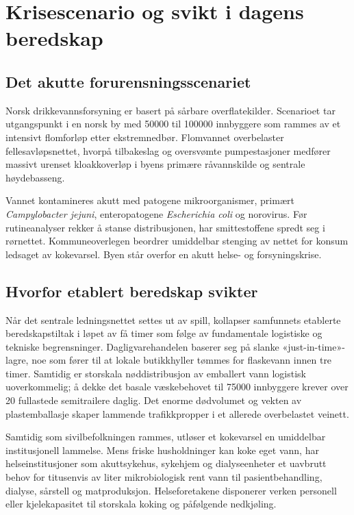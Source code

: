 \section{Krisescenario og svikt i dagens beredskap}
\label{sec:scenariet}

\subsection{Det akutte forurensningsscenariet}
Norsk drikkevannsforsyning er basert på sårbare overflatekilder. Scenarioet tar utgangspunkt i en norsk by med \num{50000} til \num{100000} innbyggere som rammes av et intensivt flomforløp etter ekstremnedbør. Flomvannet overbelaster fellesavløpsnettet, hvorpå tilbakeslag og oversvømte pumpestasjoner medfører massivt urenset kloakkoverløp i byens primære råvannskilde og sentrale høydebasseng.

Vannet kontamineres akutt med patogene mikroorganismer, primært \textit{Campylobacter jejuni}, enteropatogene \textit{Escherichia coli} og norovirus. Før rutineanalyser rekker å stanse distribusjonen, har smittestoffene spredt seg i rørnettet. Kommuneoverlegen beordrer umiddelbar stenging av nettet for konsum ledsaget av kokevarsel. Byen står overfor en akutt helse- og forsyningskrise.

\subsection{Hvorfor etablert beredskap svikter}
Når det sentrale ledningsnettet settes ut av spill, kollapser samfunnets etablerte beredskapstiltak i løpet av få timer som følge av fundamentale logistiske og tekniske begrensninger. Dagligvarehandelen baserer seg på slanke «just-in-time»-lagre, noe som fører til at lokale butikkhyller tømmes for flaskevann innen tre timer. Samtidig er storskala nøddistribusjon av emballert vann logistisk uoverkommelig; å dekke det basale væskebehovet til \num{75000} innbyggere krever over 20 fullastede semitrailere daglig. Det enorme dødvolumet og vekten av plastemballasje skaper lammende trafikkpropper i et allerede overbelastet veinett.

Samtidig som sivilbefolkningen rammes, utløser et kokevarsel en umiddelbar institusjonell lammelse. Mens friske husholdninger kan koke eget vann, har helseinstitusjoner som akuttsykehus, sykehjem og dialyseenheter et uavbrutt behov for titusenvis av liter mikrobiologisk rent vann til pasientbehandling, dialyse, sårstell og matproduksjon. Helseforetakene disponerer verken personell eller kjelekapasitet til storskala koking og påfølgende nedkjøling. 

